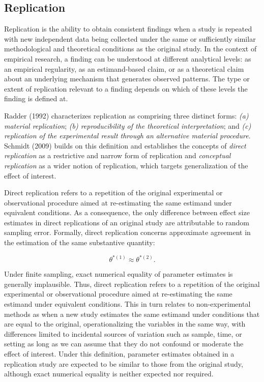 \documentclass[
  12pt,
  letterpaper,
  man]{apa7}
\begin{document}
\subsection{Replication}\label{replication}

Replication is the ability to obtain consistent findings when a study is
repeated with new independent data being collected under the same or
sufficiently similar methodological and theoretical conditions as the
original study. In the context of empirical research, a finding can be
understood at different analytical levels: as an empirical regularity,
as an estimand-based claim, or as a theoretical claim about an
underlying mechanism that generates observed patterns. The type or
extent of replication relevant to a finding depends on which of these
levels the finding is defined at.

Radder (1992) characterizes replication as comprising three distinct
forms: \emph{(a) material replication}; \emph{(b) reproducibility of the
theoretical interpretation}; and \emph{(c) replication of the
experimental result through an alternative material procedure}. Schmidt
(2009) builds on this definition and establishes the concepts of
\emph{direct replication} as a restrictive and narrow form of
replication and \emph{conceptual replication} as a wider notion of
replication, which targets generalization of the effect of interest.

Direct replication refers to a repetition of the original experimental
or observational procedure aimed at re-estimating the same estimand
under equivalent conditions. As a consequence, the only difference
between effect size estimates in direct replications of an original
study are attributable to random sampling error. Formally, direct
replication concerns approximate agreement in the estimation of the same
substantive quantity:

\[\theta^{*(1)} \approx \theta^{*(2)}.\]

Under finite sampling, exact numerical equality of parameter estimates
is generally implausible. Thus, direct replication refers to a
repetition of the original experimental or observational procedure aimed
at re-estimating the same estimand under equivalent conditions. This in
turn relates to non-experimental methods as when a new study estimates
the same estimand under conditions that are equal to the original,
operationalizing the variables in the same way, with differences limited
to incidental sources of variation such as sample, time, or setting as
long as we can assume that they do not confound or moderate the effect
of interest. Under this definition, parameter estimates obtained in a
replication study are expected to be similar to those from the original
study, although exact numerical equality is neither expected nor
required.
\end{document}
